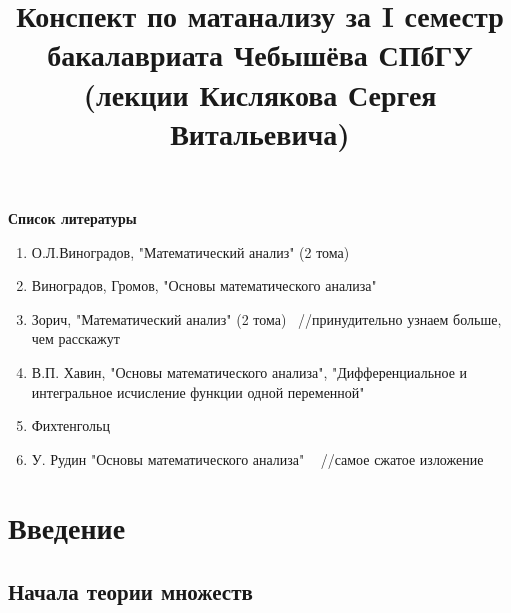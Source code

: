 \documentclass[12pt]{report}
\begin{document}
\renewcommand{\proofname}{Proof}

\newcommand{\Z}{\mathbb{Z}}
\newcommand{\N}{\mathbb{N}}
\newcommand{\R}{\mathbb{R}}
\newcommand{\Q}{\mathbb{Q}}
\newcommand{\K}{\mathbb{K}}
\newcommand{\Cm}{\mathbb{C}}
\newcommand{\Pm}{\mathbb{P}}
\newcommand{\Zero}{\mathbb{O}}
\newcommand{\ilim}{\int\limits}
\newcommand{\slim}{\sum\limits}

\theoremstyle{plain}
\newtheorem{thm}{Theorem}[section]
\newtheorem*{lm}{Lemma}
\newtheorem*{st}{Statement}
\newtheorem*{prop}{Properties}

\theoremstyle{definition}
\newtheorem*{defn}{Def}
\newtheorem*{ex}{Ex}
\newtheorem*{cor}{Corollary}
\newtheorem*{name}{Обозначение}

\theoremstyle{remark}
\newtheorem*{rem}{Rem}
\newtheorem*{note}{Note}
\newtheorem*{probl}{Упражнение}

\title{Конспект по матанализу за I семестр бакалавриата Чебышёва СПбГУ (лекции Кислякова Сергея Витальевича)}
\maketitle
\clearpage
\tableofcontents
\clearpage

\begin{center}
\bfseries{Список литературы}
\end{center}
\begin{enumerate}
\item О.Л.Виноградов, "Математический анализ"  (2 тома)
\item Виноградов, Громов, "Основы математического анализа"
\item Зорич, "Математический анализ"  (2 тома)
~//принудительно узнаем больше, чем расскажут
\item В.П. Хавин, "Основы математического анализа", "Дифференциальное и интегральное исчисление функции одной переменной"
\item Фихтенгольц
\item У. Рудин "Основы математического анализа"
~ //самое сжатое изложение
\end{enumerate}
\newpage

\chapter{Введение}
\section{Начала теории множеств}
\end{document}
